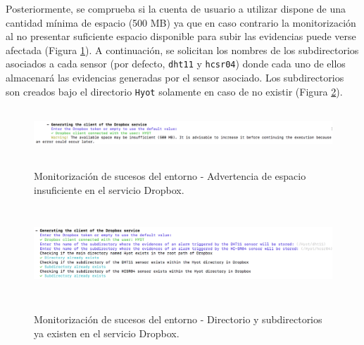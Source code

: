 \documentclass[12pt,a4paper, twoside]{report}
\begin{document}
\begin{itemize}
	 		Posteriormente, se comprueba si la cuenta de usuario a utilizar dispone de una cantidad mínima de espacio (500 MB) ya que en caso contrario la monitorización al no presentar suficiente espacio disponible para subir las evidencias puede verse afectada (Figura \ref{fig:userguide_monitoring_space}). A continuación, se solicitan los nombres de los subdirectorios asociados a cada \gls{sensor} (por defecto, \texttt{dht11} y \texttt{hcsr04}) donde cada uno de ellos almacenará las evidencias generadas por el \gls{sensor} asociado. Los subdirectorios son creados bajo el directorio \texttt{Hyot} solamente en caso de no existir (Figura \ref{fig:userguide_monitoring_dropbox}).
	 	
	 		\begin{figure}[!ht]   
				\caption{Monitorización de sucesos del entorno - Advertencia de espacio insuficiente en el servicio Dropbox.} 
				\begin{center} 
					\includegraphics[width=17cm,height=1.8cm]{Images/userGuide/monitoring/space} \\
					\label{fig:userguide_monitoring_space} 
				\end{center}  
			\end{figure}	 	
			
			\begin{figure}[!ht]   
				\caption{Monitorización de sucesos del entorno - Directorio y subdirectorios ya existen en el servicio Dropbox.} 
				\begin{center} 
					\includegraphics[width=16cm,height=3.5cm]{Images/userGuide/monitoring/dirDropbox} \\
					\label{fig:userguide_monitoring_dropbox} 
				\end{center}  
			\end{figure}	 	
	 	
	 	\newpage 
	 	

\end{itemize}
\end{document}
